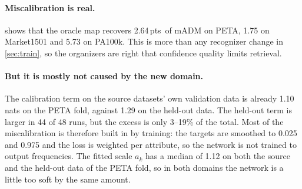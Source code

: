 \documentclass[10pt,twocolumn,letterpaper]{article}
\newcommand{\pts}{\,pts}
\begin{document}
\begin{table}[t]
\centering\small
\setlength{\tabcolsep}{3pt}
\caption{Calibration on held-out and source data (means over runs). The map is $\sigma(a_kz+b_k)$ per attribute; ``scale'' is $a_k$, ``bias'' is $b_k$. The last row is the oracle.}
\label{tab:calib}
\end{table}

\paragraph{Miscalibration is real.}  shows that the oracle map recovers 2.64\pts\ of mADM on PETA, 1.75 on Market1501 and 5.73 on PA100k. This is more than any recognizer change in \cref{sec:train}, so the organizers are right that confidence quality limits retrieval.

\paragraph{But it is mostly not caused by the new domain.} The calibration term on the source datasets' own validation data is already 1.10 nats on the PETA fold, against 1.29 on the held-out data. The held-out term is larger in 44 of 48 runs, but the excess is only 3--19\% of the total. Most of the miscalibration is therefore built in by training: the targets are smoothed to 0.025 and 0.975 and the loss is weighted per attribute, so the network is not trained to output frequencies. The fitted scale $a_k$ has a median of 1.12 on both the source and the held-out data of the PETA fold, so in both domains the network is a little too soft by the same amount.
\end{document}
